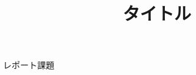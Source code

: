 \documentclass[uplatex, 11pt,a4j, titlepage]{jsarticle}
\begin{document}
\title{タイトル}{レポート課題}
\end{document}
